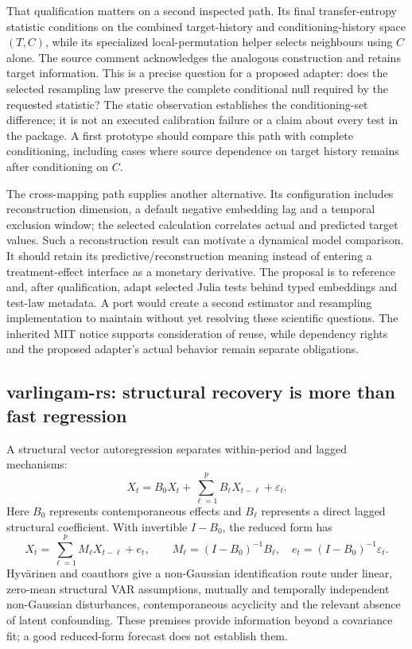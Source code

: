 That qualification matters on a second inspected path. Its final
transfer-entropy statistic conditions on the combined target-history and
conditioning-history space $(T,C)$, while its specialized local-permutation
helper selects neighbours using $C$ alone. The source comment acknowledges
the analogous construction and retains target information. This is a precise
question for a proposed adapter: does the selected resampling law preserve
the complete conditional null required by the requested statistic?
The static observation establishes the conditioning-set difference; it is
not an executed calibration failure or a claim about every test in the
package. A first prototype should compare this path with complete
conditioning, including cases where source dependence on target history
remains after conditioning on $C$.
\citep{exec17_temporal_associations}

The cross-mapping path supplies another alternative. Its configuration
includes reconstruction dimension, a default negative embedding lag and a
temporal exclusion window; the selected calculation correlates actual and
predicted target values. Such a reconstruction result can motivate a dynamical
model comparison. It should retain its predictive/reconstruction meaning
instead of entering a treatment-effect interface as a monetary derivative.
The proposal is to reference and, after qualification, adapt selected Julia
tests behind typed embeddings and test-law metadata. A port would create a
second estimator and resampling implementation to maintain without yet
resolving these scientific questions. The inherited MIT notice supports
consideration of reuse, while dependency rights and the proposed adapter's
actual behavior remain separate obligations.
\citep{exec17_temporal_associations}

\subsection{varlingam-rs: structural recovery is more than fast regression}

A structural vector autoregression separates within-period and lagged
mechanisms:
\[
 X_t=B_0X_t+\sum_{\ell=1}^{p}B_\ell X_{t-\ell}+\varepsilon_t.
\]
Here $B_0$ represents contemporaneous effects and $B_\ell$ represents a direct
lagged structural coefficient. With invertible $I-B_0$, the reduced form has
\[
 X_t=\sum_{\ell=1}^{p}M_\ell X_{t-\ell}+e_t,\qquad
 M_\ell=(I-B_0)^{-1}B_\ell,\quad
 e_t=(I-B_0)^{-1}\varepsilon_t.
\]
Hyv\"arinen and coauthors give a non-Gaussian identification route under
linear, zero-mean structural VAR assumptions, mutually and temporally
independent non-Gaussian disturbances, contemporaneous acyclicity and the
relevant absence of latent confounding. These premises provide information
beyond a covariance fit; a good reduced-form forecast does not establish
them.
\citep{hyvarinen2010}

